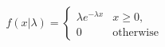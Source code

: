 $$
f(x|\lambda) =
\begin{cases}
\lambda e^{-\lambda x} & x \geq 0, \\
0 & \text{otherwise}
\end{cases}
$$
